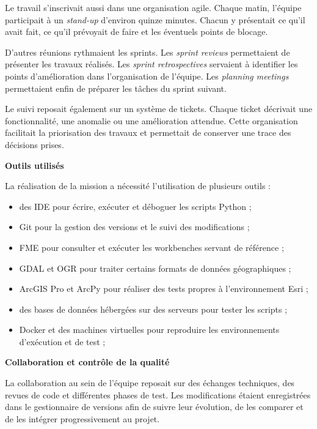 Le travail s'inscrivait aussi dans une organisation agile. Chaque matin,
l'équipe participait à un \textit{stand-up} d'environ quinze minutes. Chacun y
présentait ce qu'il avait fait, ce qu'il prévoyait de faire et les éventuels
points de blocage.

D'autres réunions rythmaient les sprints. Les \textit{sprint reviews}
permettaient de présenter les travaux réalisés. Les \textit{sprint
retrospectives} servaient à identifier les points d'amélioration dans
l'organisation de l'équipe. Les \textit{planning meetings} permettaient enfin
de préparer les tâches du sprint suivant.

Le suivi reposait également sur un système de tickets. Chaque ticket décrivait
une fonctionnalité, une anomalie ou une amélioration attendue. Cette
organisation facilitait la priorisation des travaux et permettait de conserver
une trace des décisions prises.

\medskip

\noindent
\textbf{Outils utilisés}

\medskip

La réalisation de la mission a nécessité l'utilisation de plusieurs outils :

\begin{itemize}
\item des IDE pour écrire, exécuter et déboguer les scripts Python ;
\item Git pour la gestion des versions et le suivi des modifications ;
\item FME pour consulter et exécuter les workbenches servant de référence ;
\item GDAL et OGR pour traiter certains formats de données géographiques ;
\item ArcGIS Pro et ArcPy pour réaliser des tests propres à l'environnement
Esri ;
\item des bases de données hébergées sur des serveurs pour tester les scripts ;
\item Docker et des machines virtuelles pour reproduire les environnements
d'exécution et de test ;
\end{itemize}


\medskip

\noindent
\textbf{Collaboration et contrôle de la qualité}

\medskip

La collaboration au sein de l'équipe reposait sur des échanges techniques, des
revues de code et différentes phases de test. Les modifications étaient
enregistrées dans le gestionnaire de versions afin de suivre leur évolution,
de les comparer et de les intégrer progressivement au projet.

